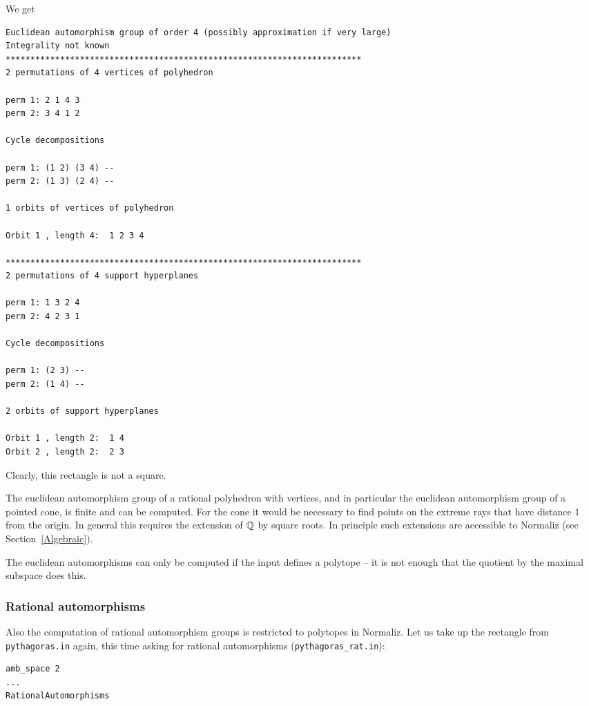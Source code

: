 We get
\begin{Verbatim}
Euclidean automorphism group of order 4 (possibly approximation if very large)
Integrality not known
************************************************************************
2 permutations of 4 vertices of polyhedron

perm 1: 2 1 4 3
perm 2: 3 4 1 2

Cycle decompositions 

perm 1: (1 2) (3 4) --
perm 2: (1 3) (2 4) --

1 orbits of vertices of polyhedron

Orbit 1 , length 4:  1 2 3 4

************************************************************************
2 permutations of 4 support hyperplanes

perm 1: 1 3 2 4
perm 2: 4 2 3 1

Cycle decompositions 

perm 1: (2 3) --
perm 2: (1 4) --

2 orbits of support hyperplanes

Orbit 1 , length 2:  1 4
Orbit 2 , length 2:  2 3
\end{Verbatim}
Clearly, this rectangle is not a square.

The euclidean automorphism group of a rational polyhedron with vertices, and in particular the euclidean automorphism group of a pointed cone, is finite and can be computed. For the cone it would be necessary to find points on the extreme rays that have distance $1$ from the origin. In general this requires the extension of ${\mathbb Q}$ by square roots. In principle such extensions are accessible to Normaliz (see Section~\ref{Algebraic}).

The euclidean automorphisms can only be computed if the input defines a polytope -- it is not enough that the quotient by the maximal subspace does this.


\subsubsection{Rational automorphisms}

Also the computation of rational automorphism groups is restricted to polytopes in Normaliz. Let us take up the rectangle from \verb|pythagoras.in| again, this time asking for rational automorphisms (\verb|pythagoras_rat.in|):
\begin{Verbatim}
amb_space 2
...
RationalAutomorphisms
\end{Verbatim}

